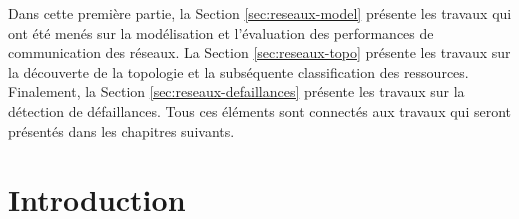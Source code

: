 \begin{resume}
	Dans cette première partie, la Section \ref{sec:reseaux-model} présente les travaux qui ont été menés sur la modélisation et l'évaluation des performances de communication des réseaux. La Section \ref{sec:reseaux-topo} présente les travaux sur la découverte de la topologie et la subséquente classification des ressources. Finalement, la Section \ref{sec:reseaux-defaillances} présente les travaux sur la détection de défaillances. Tous ces éléments sont connectés aux travaux qui seront présentés dans les chapitres suivants.  
	
\end{resume}

\section{Introduction} \label{sec:intro}

